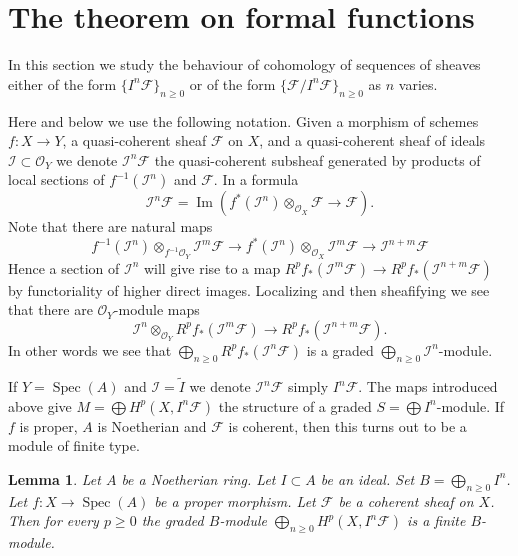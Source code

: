 \documentclass{stacks-project}
\newenvironment{reference}{\comment}{\endcomment}
\theoremstyle{plain}
\newtheorem{lemma}[subsection]{Lemma}
\theoremstyle{definition}
\theoremstyle{remark}
\numberwithin{equation}{subsection}
\def\Spec{\mathop{\mathrm{Spec}}}
\def\Im{\mathop{\mathrm{Im}}}
\begin{document}
\section{The theorem on formal functions}
\label{section-theorem-formal-functions}

\noindent
In this section we study the behaviour of cohomology of
sequences of sheaves either of the form $\{I^n\mathcal{F}\}_{n \geq 0}$
or of the form $\{\mathcal{F}/I^n\mathcal{F}\}_{n \geq 0}$ as
$n$ varies.

\medskip\noindent
Here and below we use the following notation.
Given a morphism of schemes $f : X \to Y$, a quasi-coherent sheaf
$\mathcal{F}$ on $X$, and a quasi-coherent sheaf of ideals
$\mathcal{I} \subset \mathcal{O}_Y$ we denote
$\mathcal{I}^n\mathcal{F}$ the quasi-coherent subsheaf generated
by products of local sections of $f^{-1}(\mathcal{I}^n)$ and
$\mathcal{F}$. In a formula
$$
\mathcal{I}^n\mathcal{F}
=
\Im\left(
f^*(\mathcal{I}^n) \otimes_{\mathcal{O}_X} \mathcal{F}
\longrightarrow
\mathcal{F}
\right).
$$
Note that there are natural maps
$$
f^{-1}(\mathcal{I}^n) \otimes_{f^{-1}\mathcal{O}_Y} \mathcal{I}^m\mathcal{F}
\longrightarrow
f^*(\mathcal{I}^n) \otimes_{\mathcal{O}_X} \mathcal{I}^m\mathcal{F}
\longrightarrow
\mathcal{I}^{n + m}\mathcal{F}
$$
Hence a section of $\mathcal{I}^n$ will give rise to a
map $R^pf_*(\mathcal{I}^m\mathcal{F}) \to
R^pf_*(\mathcal{I}^{n + m}\mathcal{F})$ by functoriality
of higher direct images. Localizing and then sheafifying we
see that there are $\mathcal{O}_Y$-module maps
$$
\mathcal{I}^n \otimes_{\mathcal{O}_Y} R^pf_*(\mathcal{I}^m\mathcal{F})
\longrightarrow
R^pf_*(\mathcal{I}^{n + m}\mathcal{F}).
$$
In other words we see that
$\bigoplus_{n \geq 0} R^pf_*(\mathcal{I}^n\mathcal{F})$
is a graded $\bigoplus_{n \geq 0} \mathcal{I}^n$-module.

\medskip\noindent
If $Y = \Spec(A)$ and $\mathcal{I} = \widetilde{I}$ we denote
$\mathcal{I}^n\mathcal{F}$ simply $I^n\mathcal{F}$. The maps
introduced above give $M = \bigoplus H^p(X, I^n\mathcal{F})$ the
structure of a graded $S = \bigoplus I^n$-module. If $f$ is proper,
$A$ is Noetherian and $\mathcal{F}$ is coherent, then this turns out
to be a module of finite type.

\begin{lemma}
\label{lemma-cohomology-powers-ideal-times-F}
\begin{reference}
\cite[III Cor 3.3.2]{EGA}
\end{reference}
Let $A$ be a Noetherian ring.
Let $I \subset A$ be an ideal.
Set $B = \bigoplus_{n \geq 0} I^n$.
Let $f : X \to \Spec(A)$ be a proper morphism.
Let $\mathcal{F}$ be a coherent sheaf on $X$.
Then for every $p \geq 0$ the graded $B$-module
$\bigoplus_{n \geq 0} H^p(X, I^n\mathcal{F})$ is
a finite $B$-module.
\end{lemma}
\end{document}
